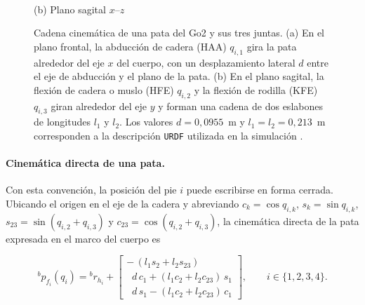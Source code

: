 \documentclass[12pt,a4paper]{report}
\begin{document}
\begin{figure}[H]
\begin{minipage}[b]{0.46\textwidth}
\\[3pt]
{\footnotesize (b) Plano sagital \(x\)--\(z\)}
\end{minipage}
\caption{Cadena cinemática de una pata del Go2 y sus tres juntas. (a) En el plano
frontal, la abducción de cadera (HAA) \(q_{i,1}\) gira la pata alrededor del eje
\(x\) del cuerpo, con un desplazamiento lateral \(d\) entre el eje de abducción y
el plano de la pata. (b) En el plano sagital, la flexión de cadera o muslo
(HFE) \(q_{i,2}\) y la flexión de rodilla (KFE) \(q_{i,3}\) giran alrededor del
eje \(y\) y forman una cadena de dos eslabones de longitudes \(l_1\) y \(l_2\).
Los valores \(d=0{,}0955\)~m y \(l_1=l_2=0{,}213\)~m corresponden a la
descripción \texttt{URDF} utilizada en la simulación \citep{UnitreeGo2ROS2}.}
\label{fig:go2_leg_kinematics}
\end{figure}

\paragraph{Cinemática directa de una pata.}
Con esta convención, la posición del pie \(i\) puede escribirse en forma cerrada.
Ubicando el origen en el eje de la cadera y abreviando \(c_k = \cos q_{i,k}\),
\(s_k = \sin q_{i,k}\), \(s_{23} = \sin(q_{i,2}+q_{i,3})\) y
\(c_{23} = \cos(q_{i,2}+q_{i,3})\), la cinemática directa de la pata expresada en
el marco del cuerpo es

\begin{equation}
{}^{b}\!p_{f_i}(q_i) =
{}^{b}r_{h_i} +
\begin{bmatrix}
-\,(l_1 s_2 + l_2 s_{23}) \\[2pt]
\;\; d\, c_1 + (l_1 c_2 + l_2 c_{23})\, s_1 \\[2pt]
\;\; d\, s_1 - (l_1 c_2 + l_2 c_{23})\, c_1
\end{bmatrix},
\qquad i \in \{1,2,3,4\}.
\label{eq:leg_forward_kinematics}
\end{equation}
\end{document}
